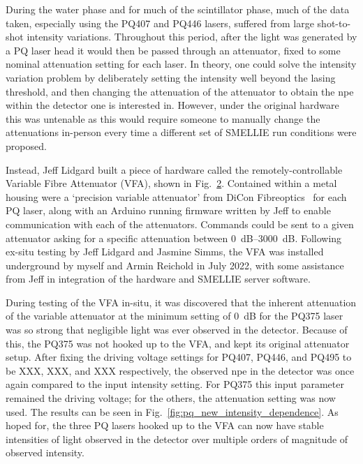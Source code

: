 \begin{figure}
    \centering
    \caption[]{}
    \label{fig:pq_threshold_intensity_variation}
\end{figure}

During the water phase and for much of the scintillator phase, much of the data taken, especially using the PQ407 and PQ446 lasers, suffered from large shot-to-shot intensity variations. Throughout this period, after the light was generated by a PQ laser head it would then be passed through an attenuator, fixed to some nominal attenuation setting for each laser. In theory, one could solve the intensity variation problem by deliberately setting the intensity well beyond the lasing threshold, and then changing the attenuation of the attenuator to obtain the npe within the detector one is interested in. However, under the original hardware this was untenable as this would require someone to manually change the attenuations in-person every time a different set of SMELLIE run conditions were proposed.

Instead, Jeff Lidgard built a piece of hardware called the remotely-controllable Variable Fibre Attenuator (VFA), shown in Fig.~\ref{fig:vfa_picture}. Contained within a metal housing were a `precision variable attenuator' from DiCon Fibreoptics~\cite{} %
for each PQ laser, along with an Arduino running firmware written by Jeff to enable communication with each of the attenuators. Commands could be sent to a given attenuator asking for a specific attenuation between \SIrange{0}{3000}{\dB}.
Following ex-situ testing by Jeff Lidgard and Jasmine Simms, the VFA was installed underground by myself and Armin Reichold in July 2022, with some assistance from Jeff in integration of the hardware and SMELLIE server software.

\begin{figure}
    \centering
    \caption[]{}
    \label{fig:vfa_picture}
\end{figure}

During testing of the VFA in-situ, it was discovered that the inherent attenuation of the variable attenuator at the minimum setting of \SI{0}{\dB} for the PQ375 laser was so strong that negligible light was ever observed in the detector. Because of this, the PQ375 was not hooked up to the VFA, and kept its original attenuator setup. After fixing the driving voltage settings for PQ407, PQ446, and PQ495 to be XXX, XXX, and XXX respectively, %
the observed npe in the detector was once again compared to the input intensity setting. For PQ375 this input parameter remained the driving voltage; for the others, the attenuation setting was now used. The results can be seen in Fig.~\ref{fig:pq_new_intensity_dependence}. As hoped for, the three PQ lasers hooked up to the VFA can now have stable intensities of light observed in the detector over multiple orders of magnitude of observed intensity.

